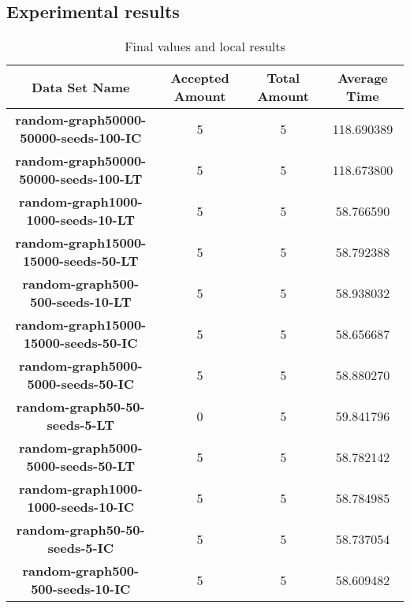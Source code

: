 \documentclass[lang=en,12pt]{elegantpaper}
\begin{document}
\subsection{Experimental results}

\begin{table}[htbp]
  \small
  \centering
  \caption{Final values and local results \label{tab:reg}}
    \begin{tabular}{cccc}
    \toprule
               Data Set Name  &   Accepted Amount     &     Total Amount    &    Average Time      \\
    \midrule
    \textbf{random-graph50000-50000-seeds-100-IC}		&5	&5 & 118.690389 \\
    \textbf{random-graph50000-50000-seeds-100-LT}		&5	&5 & 118.673800\\
    \textbf{random-graph1000-1000-seeds-10-LT}		  &5	&5 & 58.766590\\
    \textbf{random-graph15000-15000-seeds-50-LT}		&5	&5 & 58.792388\\
    \textbf{random-graph500-500-seeds-10-LT}		    &5	&5 & 58.938032\\
    \textbf{random-graph15000-15000-seeds-50-IC}		&5	&5 & 58.656687\\
    \textbf{random-graph5000-5000-seeds-50-IC}		  &5	&5 & 58.880270\\
    \textbf{random-graph50-50-seeds-5-LT}		        &0	&5 & 59.841796\\
    \textbf{random-graph5000-5000-seeds-50-LT}		  &5	&5 & 58.782142\\
    \textbf{random-graph1000-1000-seeds-10-IC}		  &5	&5 & 58.784985\\
    \textbf{random-graph50-50-seeds-5-IC}		        &5	&5 & 58.737054\\
    \textbf{random-graph500-500-seeds-10-IC}		    &5	&5 & 58.609482\\
    \bottomrule
    \end{tabular}%
\end{table}%
\end{document}

